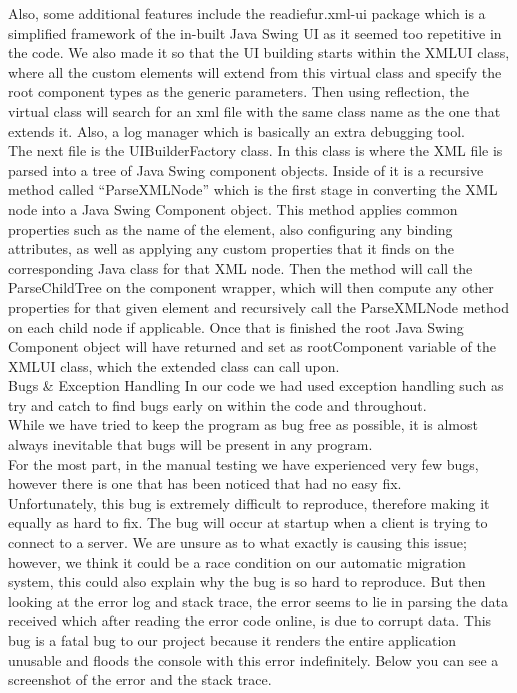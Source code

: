 \documentclass{COMPXXXX}
\begin{document}
\normalsize \textrm {Also, some additional features include the readiefur.xml-ui package which is a simplified framework of the in-built Java Swing UI as it seemed too repetitive in the code. We also made it so that the UI building starts within the XMLUI class, where all the custom elements will extend from this virtual class and specify the root component types as the generic parameters. Then using reflection, the virtual class will search for an xml file with the same class name as the one that extends it. Also, a log manager which is basically an extra debugging tool.\\
The next file is the UIBuilderFactory class. In this class is where the XML file is parsed into a tree of Java Swing component objects. Inside of it is a recursive method called “ParseXMLNode” which is the first stage in converting the XML node into a Java Swing Component object. This method applies common properties such as the name of the element, also configuring any binding attributes, as well as applying any custom properties that it finds on the corresponding Java class for that XML node. Then the method will call the ParseChildTree on the component wrapper, which will then compute any other properties for that given element and recursively call the ParseXMLNode method on each child node if applicable. Once that is finished the root Java Swing Component object will have returned and set as rootComponent variable of the XMLUI class, which the extended class can call upon.\\
Bugs & Exception Handling
In our code we had used exception handling such as try and catch to find bugs early on within the code and throughout.\\
While we have tried to keep the program as bug free as possible, it is almost always inevitable that bugs will be present in any program.\\
For the most part, in the manual testing we have experienced very few bugs, however there is one that has been noticed that had no easy fix.\\
Unfortunately, this bug is extremely difficult to reproduce, therefore making it equally as hard to fix. The bug will occur at startup when a client is trying to connect to a server. We are unsure as to what exactly is causing this issue; however, we think it could be a race condition on our automatic migration system, this could also explain why the bug is so hard to reproduce. But then looking at the error log and stack trace, the error seems to lie in parsing the data received which after reading the error code online, is due to corrupt data. This bug is a fatal bug to our project because it renders the entire application unusable and floods the console with this error indefinitely. Below you can see a screenshot of the error and the stack trace.\\
}
\end{document}
